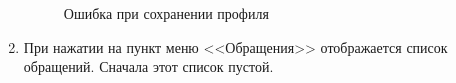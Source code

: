 \documentclass{../includes/TechDoc}
\begin{document}
\begin{enumerate}
\begin{figure}[ht]
\begin{center}
\begin{minipage}[ht]{0.49\linewidth}
                    \caption{Ошибка при сохранении профиля}
                    \label{ris:profile_error}
                \end{minipage}
            \end{center}
        \end{figure}

        \item При нажатии на пункт меню <<Обращения>> отображается список обращений.
        Сначала этот список пустой.


\end{enumerate}
\end{document}
